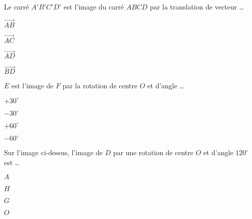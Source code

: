

\begin{QCM}
  \begin{GroupeQCM}
    \begin{exercice}
       \begin{center}  \end{center}
       Le carré $A'B'C'D'$ est l'image du carré $ABCD$ par la translation de vecteur \ldots
      \begin{ChoixQCM}{4}
      \item $\overrightarrow{AB}$
      \item $\overrightarrow{AC}$
      \item $\overrightarrow{AD}$
      \item $\overrightarrow{BD}$
      \end{ChoixQCM}
\begin{corrige}
   \end{corrige}
    \end{exercice}
    
    
    \begin{exercice}
         \begin{center}   \end{center}
      $E$ est l'image de $F$ par la rotation de centre $O$ et d'angle \ldots
      \begin{ChoixQCM}{4}
      \item $+ 30^\circ$
      \item $- 30^\circ$
      \item $+ 60^\circ$
      \item $- 60^\circ$
      \end{ChoixQCM}
\begin{corrige}
   \end{corrige}
    \end{exercice}
    
    
    \begin{exercice}
      Sur l'image ci-dessus, l'image de $D$ par une rotation de centre $O$ et d'angle $120^\circ$ est \ldots
      \begin{ChoixQCM}{4}
      \item $A$
      \item $H$
      \item $G$
      \item $O$
      \end{ChoixQCM}
\begin{corrige}
   \end{corrige}
    \end{exercice}


\end{GroupeQCM}
\end{QCM}

  
